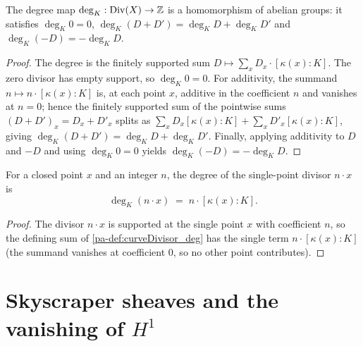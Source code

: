 \begin{theorem}
  \label{pa-thm:curveDivisor_deg_hom}
  \leanok

  The degree map \(\deg_K : \operatorname{Div}(X) \to \mathbb{Z}\) is a homomorphism of abelian groups: it satisfies
  \(\deg_K 0 = 0\), \(\deg_K(D + D') = \deg_K D + \deg_K D'\) and \(\deg_K(-D) = -\deg_K D\).
\end{theorem}
\begin{proof}
  \leanok
  The degree is the finitely supported sum \(D \mapsto \sum_x D_x \cdot [\kappa(x) : K]\). The
  zero divisor has empty support, so \(\deg_K 0 = 0\). For additivity, the summand
  \(n \mapsto n \cdot [\kappa(x) : K]\) is, at each point \(x\), additive in the coefficient
  \(n\) and vanishes at \(n = 0\); hence the finitely supported sum of the pointwise sums
  \((D + D')_x = D_x + D'_x\) splits as \(\sum_x D_x[\kappa(x):K] + \sum_x D'_x[\kappa(x):K]\),
  giving \(\deg_K(D + D') = \deg_K D + \deg_K D'\). Finally, applying additivity to \(D\) and
  \(-D\) and using \(\deg_K 0 = 0\) yields \(\deg_K(-D) = -\deg_K D\).
\end{proof}

\begin{lemma}
  \label{pa-lem:curveDivisor_deg_single}
  \leanok

  For a closed point \(x\) and an integer \(n\), the degree of the single-point divisor
  \(n \cdot x\) is
  \[
    \deg_K(n \cdot x) \;=\; n \cdot [\kappa(x) : K] .
  \]
\end{lemma}
\begin{proof}
  \leanok
  The divisor \(n \cdot x\) is supported at the single point \(x\) with coefficient \(n\), so the
  defining sum of \ref{pa-def:curveDivisor_deg} has the single term \(n \cdot [\kappa(x) : K]\)
  (the summand vanishes at coefficient \(0\), so no other point contributes).
\end{proof}

\section{Skyscraper sheaves and the vanishing of \(H^1\)}


